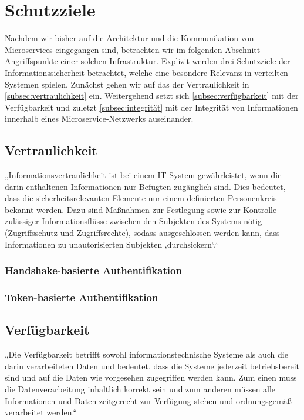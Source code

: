 \section{Schutzziele}
Nachdem wir bisher auf die Architektur und die Kommunikation von Microservices eingegangen sind, betrachten wir im folgenden Abschnitt Angriffspunkte einer solchen Infrastruktur. Explizit werden drei Schutzziele der Informationssicherheit betrachtet, welche eine besondere Relevanz in verteilten Systemen spielen. Zunächst gehen wir auf das der Vertraulichkeit in \autoref{subsec:vertraulichkeit} ein. Weitergehend setzt sich \autoref{subsec:verfügbarkeit} mit der Verfügbarkeit und zuletzt \autoref{subsec:integrität} mit der Integrität von Informationen innerhalb eines Microservice-Netzwerks auseinander.


\subsection{Vertraulichkeit}
\label{subsec:vertraulichkeit}
„Informationsvertraulichkeit ist bei einem IT-System gewährleistet, wenn die darin enthaltenen Informationen nur Befugten zugänglich sind. Dies bedeutet, dass die sicherheitsrelevanten Elemente nur einem definierten Personenkreis bekannt werden. Dazu sind Maßnahmen zur Festlegung sowie zur Kontrolle zulässiger Informationsflüsse zwischen den Subjekten des Systems nötig (Zugriffsschutz und Zugriffsrechte), sodass ausgeschlossen werden kann, dass Informationen zu unautorisierten Subjekten ‚durchsickern‘.“ \cite{Bedner+10}

\subsubsection{Handshake-basierte Authentifikation}

\subsubsection{Token-basierte Authentifikation}


\subsection{Verfügbarkeit}
\label{subsec:verfügbarkeit}
„Die Verfügbarkeit betrifft sowohl informationstechnische Systeme als auch die darin verarbeiteten Daten und bedeutet, dass die Systeme jederzeit betriebsbereit sind und auf die Daten wie vorgesehen zugegriffen werden kann. Zum einen muss die Datenverarbeitung inhaltlich korrekt sein und zum anderen müssen alle Informationen und Daten zeitgerecht zur Verfügung stehen und ordnungsgemäß verarbeitet werden.“ \cite{Bedner+10}

